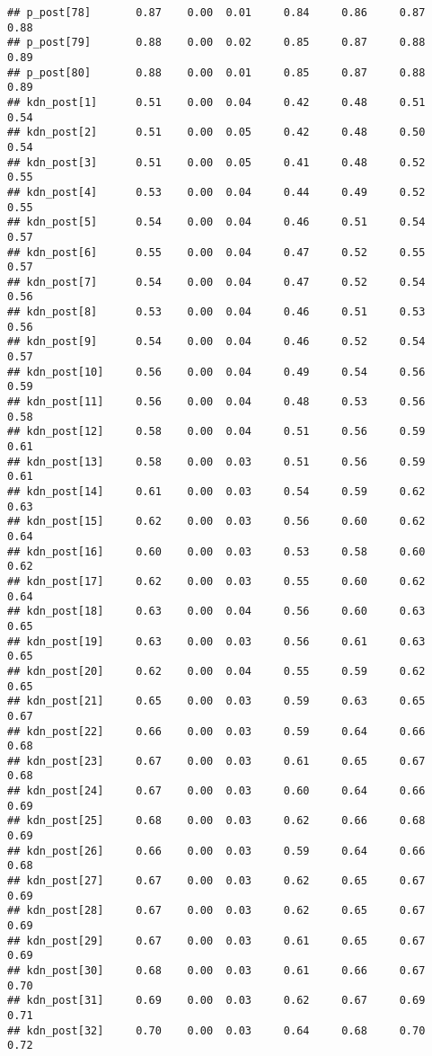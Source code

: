 \documentclass{article}\usepackage[]{graphicx}\usepackage[]{color}
\makeatletter
\newenvironment{kframe}{%
 \def\at@end@of@kframe{}%
 \ifinner\ifhmode%
  \def\at@end@of@kframe{\end{minipage}}%
  \begin{minipage}{\columnwidth}%
 \fi\fi%
 \def\FrameCommand##1{\hskip\@totalleftmargin \hskip-\fboxsep
 \colorbox{shadecolor}{##1}\hskip-\fboxsep
     \hskip-\linewidth \hskip-\@totalleftmargin \hskip\columnwidth}%
 \MakeFramed {\advance\hsize-\width
   \@totalleftmargin\z@ \linewidth\hsize
   \@setminipage}}%
 {\par\unskip\endMakeFramed%
 \at@end@of@kframe}
\newenvironment{knitrout}{}{} %
\makeatother
\begin{document}
\begin{knitrout}
\begin{kframe}
\begin{verbatim}
## p_post[78]       0.87    0.00  0.01     0.84     0.86     0.87     0.88
## p_post[79]       0.88    0.00  0.02     0.85     0.87     0.88     0.89
## p_post[80]       0.88    0.00  0.01     0.85     0.87     0.88     0.89
## kdn_post[1]      0.51    0.00  0.04     0.42     0.48     0.51     0.54
## kdn_post[2]      0.51    0.00  0.05     0.42     0.48     0.50     0.54
## kdn_post[3]      0.51    0.00  0.05     0.41     0.48     0.52     0.55
## kdn_post[4]      0.53    0.00  0.04     0.44     0.49     0.52     0.55
## kdn_post[5]      0.54    0.00  0.04     0.46     0.51     0.54     0.57
## kdn_post[6]      0.55    0.00  0.04     0.47     0.52     0.55     0.57
## kdn_post[7]      0.54    0.00  0.04     0.47     0.52     0.54     0.56
## kdn_post[8]      0.53    0.00  0.04     0.46     0.51     0.53     0.56
## kdn_post[9]      0.54    0.00  0.04     0.46     0.52     0.54     0.57
## kdn_post[10]     0.56    0.00  0.04     0.49     0.54     0.56     0.59
## kdn_post[11]     0.56    0.00  0.04     0.48     0.53     0.56     0.58
## kdn_post[12]     0.58    0.00  0.04     0.51     0.56     0.59     0.61
## kdn_post[13]     0.58    0.00  0.03     0.51     0.56     0.59     0.61
## kdn_post[14]     0.61    0.00  0.03     0.54     0.59     0.62     0.63
## kdn_post[15]     0.62    0.00  0.03     0.56     0.60     0.62     0.64
## kdn_post[16]     0.60    0.00  0.03     0.53     0.58     0.60     0.62
## kdn_post[17]     0.62    0.00  0.03     0.55     0.60     0.62     0.64
## kdn_post[18]     0.63    0.00  0.04     0.56     0.60     0.63     0.65
## kdn_post[19]     0.63    0.00  0.03     0.56     0.61     0.63     0.65
## kdn_post[20]     0.62    0.00  0.04     0.55     0.59     0.62     0.65
## kdn_post[21]     0.65    0.00  0.03     0.59     0.63     0.65     0.67
## kdn_post[22]     0.66    0.00  0.03     0.59     0.64     0.66     0.68
## kdn_post[23]     0.67    0.00  0.03     0.61     0.65     0.67     0.68
## kdn_post[24]     0.67    0.00  0.03     0.60     0.64     0.66     0.69
## kdn_post[25]     0.68    0.00  0.03     0.62     0.66     0.68     0.69
## kdn_post[26]     0.66    0.00  0.03     0.59     0.64     0.66     0.68
## kdn_post[27]     0.67    0.00  0.03     0.62     0.65     0.67     0.69
## kdn_post[28]     0.67    0.00  0.03     0.62     0.65     0.67     0.69
## kdn_post[29]     0.67    0.00  0.03     0.61     0.65     0.67     0.69
## kdn_post[30]     0.68    0.00  0.03     0.61     0.66     0.67     0.70
## kdn_post[31]     0.69    0.00  0.03     0.62     0.67     0.69     0.71
## kdn_post[32]     0.70    0.00  0.03     0.64     0.68     0.70     0.72

\end{verbatim}
\end{kframe}
\end{knitrout}
\end{document}
